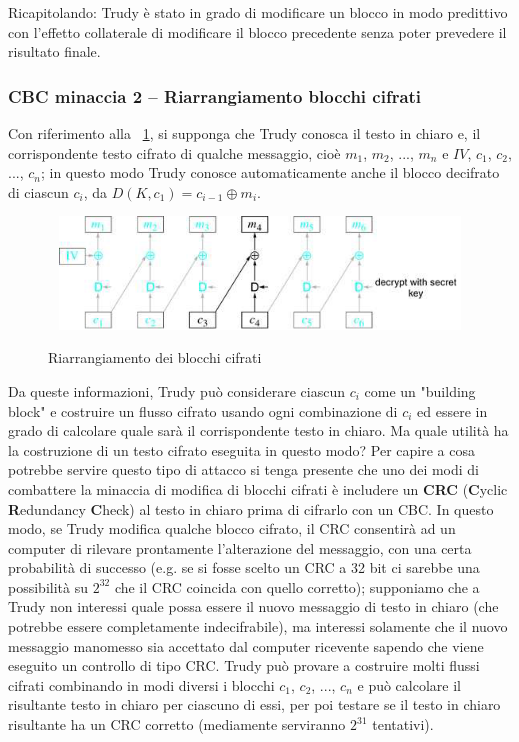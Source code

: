 \newline \newline
Ricapitolando: Trudy è stato in grado di modificare un blocco in modo predittivo con l'effetto collaterale di modificare il blocco precedente senza poter prevedere il risultato finale.
\subsubsection{CBC minaccia 2 – Riarrangiamento blocchi cifrati}
Con riferimento alla \figurename~\ref{fig:riarrangiamento_blk_cifrati}, si supponga che Trudy conosca il testo in chiaro e, il corrispondente testo cifrato di qualche messaggio, cioè $m_{1}$, $m_{2}$, ..., $m_{n}$ e $IV$, $c_{1}$, $c_{2}$, ..., $c_{n}$; in questo modo Trudy conosce automaticamente anche il blocco decifrato di ciascun $c_{i}$, da $D(K, c_{1}) = c_{i-1} \oplus m_{i}$.
\begin{figure}[htbp]
	\centering%
	\subfigure%
	{\includegraphics[height=3cm, width=12cm, keepaspectratio]{Immagini/modalita_operative/riarrangiamento_blk_cifrati.png}}
	\caption{Riarrangiamento dei blocchi cifrati \label{fig:riarrangiamento_blk_cifrati}}	
\end{figure}
Da queste informazioni, Trudy può considerare ciascun $c_{i}$ come un "building block" e costruire un flusso cifrato usando ogni combinazione di $c_{i}$ ed essere in grado di calcolare quale sarà il corrispondente testo in chiaro. \newline \newline
Ma quale utilità ha la costruzione di un testo cifrato eseguita in questo modo? Per capire a cosa potrebbe servire questo tipo di attacco si tenga presente che uno dei modi di combattere la minaccia di modifica di blocchi cifrati è includere un \textbf{CRC} (\textbf{C}yclic \textbf{R}edundancy \textbf{C}heck) al testo in chiaro prima di cifrarlo con un CBC. In questo modo, se Trudy modifica qualche blocco cifrato, il CRC consentirà ad un computer di rilevare prontamente l'alterazione del messaggio, con una certa probabilità di successo (e.g. se si fosse scelto un CRC a 32 bit ci sarebbe una possibilità su $2^{32}$ che il CRC coincida con quello corretto); supponiamo che a Trudy non interessi quale possa essere il nuovo messaggio di testo in chiaro (che potrebbe essere completamente indecifrabile), ma interessi solamente che il nuovo messaggio manomesso sia accettato dal computer ricevente sapendo che viene eseguito un controllo di tipo CRC. Trudy può provare a costruire molti flussi cifrati combinando in modi diversi i blocchi $c_{1}$, $c_{2}$, ..., $c_{n}$ e può calcolare il risultante testo in chiaro per ciascuno di essi, per poi testare se il testo in chiaro risultante ha un CRC corretto (mediamente serviranno $2^{31}$ tentativi).
